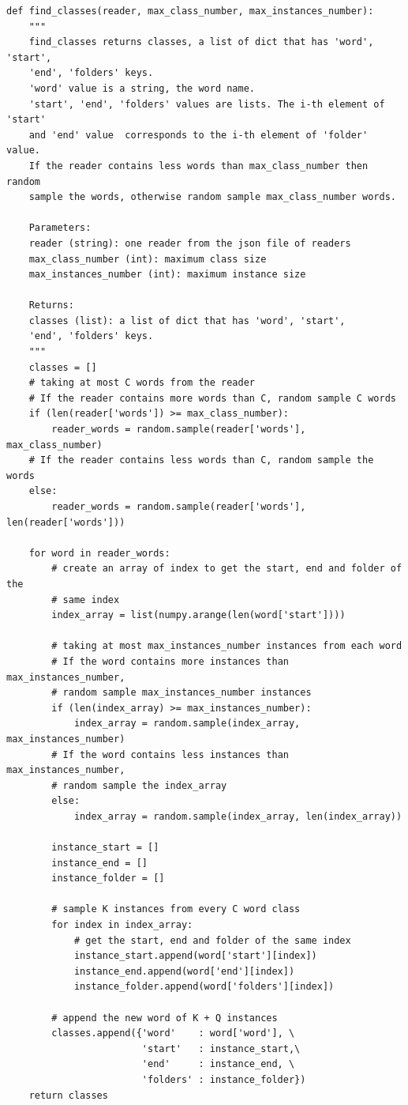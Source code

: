 \documentclass[12pt,a4paper,titlepage]{article}
\begin{document}
\begin{lstlisting}[language=iPython,firstnumber=100, caption=Funzione \texttt{find\_classes}, label=find_classes,captionpos=b]
def find_classes(reader, max_class_number, max_instances_number):
    """
    find_classes returns classes, a list of dict that has 'word', 'start',
    'end', 'folders' keys.
    'word' value is a string, the word name.
    'start', 'end', 'folders' values are lists. The i-th element of 'start' 
    and 'end' value  corresponds to the i-th element of 'folder' value.
    If the reader contains less words than max_class_number then random 
    sample the words, otherwise random sample max_class_number words.

    Parameters:
    reader (string): one reader from the json file of readers 
    max_class_number (int): maximum class size
    max_instances_number (int): maximum instance size

    Returns:
    classes (list): a list of dict that has 'word', 'start',
    'end', 'folders' keys.
    """
    classes = []
    # taking at most C words from the reader
    # If the reader contains more words than C, random sample C words
    if (len(reader['words']) >= max_class_number):
        reader_words = random.sample(reader['words'], max_class_number)
    # If the reader contains less words than C, random sample the words
    else:
        reader_words = random.sample(reader['words'], len(reader['words']))  

    for word in reader_words:
        # create an array of index to get the start, end and folder of the
        # same index
        index_array = list(numpy.arange(len(word['start'])))
        
        # taking at most max_instances_number instances from each word
        # If the word contains more instances than max_instances_number,
        # random sample max_instances_number instances
        if (len(index_array) >= max_instances_number):
            index_array = random.sample(index_array, max_instances_number)
        # If the word contains less instances than max_instances_number,
        # random sample the index_array
        else:
            index_array = random.sample(index_array, len(index_array))  

        instance_start = []
        instance_end = []
        instance_folder = []
        
        # sample K instances from every C word class
        for index in index_array:
            # get the start, end and folder of the same index
            instance_start.append(word['start'][index])
            instance_end.append(word['end'][index])
            instance_folder.append(word['folders'][index])

        # append the new word of K + Q instances
        classes.append({'word'    : word['word'], \
                        'start'   : instance_start,\
                        'end'     : instance_end, \
                        'folders' : instance_folder})
    return classes
\end{lstlisting}
\end{document}
